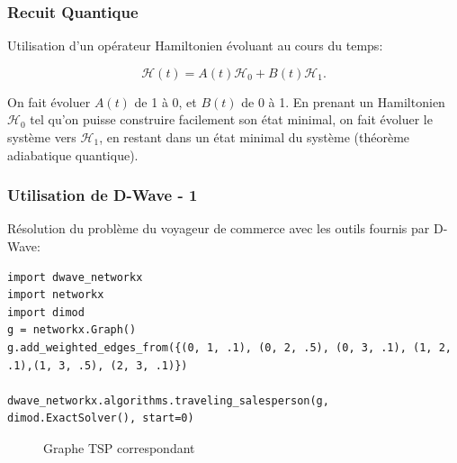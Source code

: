 \documentclass{beamer}
\begin{document}
\begin{frame}
    \frametitle{Recuit Quantique}

    Utilisation d'un opérateur Hamiltonien évoluant au cours du temps:

    \begin{equation}
        \mathcal{H}(t) = A(t) \mathcal{H}_0 + B(t) \mathcal{H}_1.
    \end{equation}

    On fait évoluer $A(t)$ de 1 à 0, et $B(t)$ de 0 à 1.
\medbreak
    En prenant un Hamiltonien $\mathcal{H}_0$ tel qu'on puisse construire facilement son état minimal, on fait évoluer le système vers $\mathcal{H}_1$, en restant dans un état minimal du système (théorème adiabatique quantique).

\end{frame}

\begin{frame}[fragile]
    \frametitle{Utilisation de D-Wave - 1}
    Résolution du problème du voyageur de commerce avec les outils fournis par D-Wave:
    \begin{lstlisting}[style=CStyle, basicstyle=\tiny]
import dwave_networkx
import networkx
import dimod
g = networkx.Graph()
g.add_weighted_edges_from({(0, 1, .1), (0, 2, .5), (0, 3, .1), (1, 2, .1),(1, 3, .5), (2, 3, .1)})

dwave_networkx.algorithms.traveling_salesperson(g, dimod.ExactSolver(), start=0)
\end{lstlisting}

\begin{figure}
    \caption{\tiny Graphe TSP correspondant}
\end{figure}

\end{frame}
\end{document}
